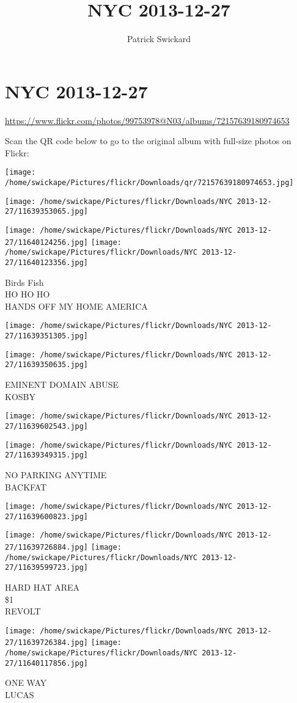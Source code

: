 \documentclass[10pt,letterpaper]{article}
\title{NYC 2013-12-27}
\author{Patrick Swickard}
\date{}
\begin{document}
\section*{NYC 2013-12-27}

\url{https://www.flickr.com/photos/99753978@N03/albums/72157639180974653}

Scan the QR code below to go to the original album with full-size photos on Flickr:

\texttt{[image: /home/swickape/Pictures/flickr/Downloads/qr/72157639180974653.jpg]}
\pagebreak

\texttt{[image: /home/swickape/Pictures/flickr/Downloads/NYC 2013-12-27/11639353065.jpg]}

\vspace{0.25in}
\texttt{[image: /home/swickape/Pictures/flickr/Downloads/NYC 2013-12-27/11640124256.jpg]}
\texttt{[image: /home/swickape/Pictures/flickr/Downloads/NYC 2013-12-27/11640123356.jpg]}

Birds Fish\\
HO HO HO\\
HANDS OFF MY HOME AMERICA
\pagebreak

\texttt{[image: /home/swickape/Pictures/flickr/Downloads/NYC 2013-12-27/11639351305.jpg]}

\vspace{0.25in}
\texttt{[image: /home/swickape/Pictures/flickr/Downloads/NYC 2013-12-27/11639350635.jpg]}

EMINENT DOMAIN ABUSE\\
KOSBY
\pagebreak

\texttt{[image: /home/swickape/Pictures/flickr/Downloads/NYC 2013-12-27/11639602543.jpg]}

\vspace{0.25in}
\texttt{[image: /home/swickape/Pictures/flickr/Downloads/NYC 2013-12-27/11639349315.jpg]}

NO PARKING ANYTIME\\
BACKFAT
\pagebreak

\texttt{[image: /home/swickape/Pictures/flickr/Downloads/NYC 2013-12-27/11639600823.jpg]}

\vspace{0.25in}
\texttt{[image: /home/swickape/Pictures/flickr/Downloads/NYC 2013-12-27/11639726884.jpg]}
\texttt{[image: /home/swickape/Pictures/flickr/Downloads/NYC 2013-12-27/11639599723.jpg]}

HARD HAT AREA\\
\$1\\
REVOLT
\pagebreak

\texttt{[image: /home/swickape/Pictures/flickr/Downloads/NYC 2013-12-27/11639726384.jpg]}
\texttt{[image: /home/swickape/Pictures/flickr/Downloads/NYC 2013-12-27/11640117856.jpg]}

ONE WAY\\
LUCAS
\pagebreak
\end{document}

